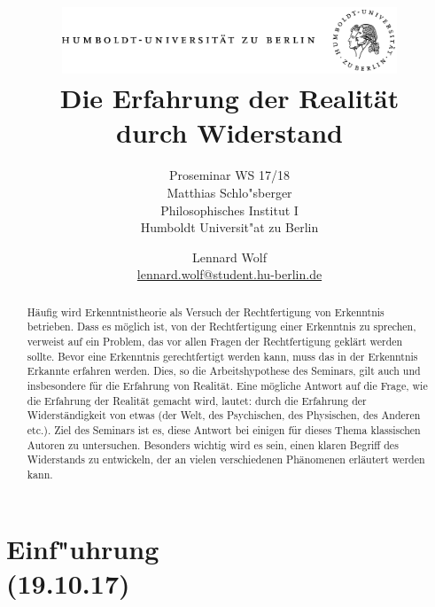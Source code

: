\documentclass[emulatestandardclasses]{scrartcl}
\date{\vspace{-3ex}}
\begin{document}
\title{
	\includegraphics*[width=0.75\textwidth]{ErstesSem/images/hu_logo.png}\\
	\vspace{24pt}
	Die Erfahrung der Realität\\durch Widerstand}
\subtitle{\vspace{10pt}Proseminar WS 17/18\\
          Matthias Schlo"sberger\\
          Philosophisches Institut I \\ 
          Humboldt Universit"at zu Berlin}
\author{Lennard Wolf\\
        \small{\href{mailto:lennard.wolf@student.hu-berlin.de}{lennard.wolf@student.hu-berlin.de}}}
\maketitle
\begin{abstract}
Häufig wird Erkenntnistheorie als Versuch der Rechtfertigung von Erkenntnis betrieben. Dass es möglich ist, von der Rechtfertigung einer Erkenntnis zu sprechen, verweist auf ein Problem, das vor allen Fragen der Rechtfertigung geklärt werden sollte. Bevor eine Erkenntnis gerechtfertigt werden kann, muss das in der Erkenntnis Erkannte erfahren werden. Dies, so die Arbeitshypothese des Seminars, gilt auch und insbesondere für die Erfahrung von Realität.
Eine mögliche Antwort auf die Frage, wie die Erfahrung der Realität gemacht wird, lautet: durch die Erfahrung der Widerständigkeit von etwas (der Welt, des Psychischen, des Physischen, des Anderen etc.). Ziel des Seminars ist es, diese Antwort bei einigen für dieses Thema klassischen Autoren zu untersuchen. Besonders wichtig wird es sein, einen klaren Begriff des Widerstands zu entwickeln, der an vielen verschiedenen Phänomenen erläutert werden kann.

\end{abstract}
\newpage

\tableofcontents
\newpage


\section{Einf"uhrung\\(19.10.17)}
\end{document}
